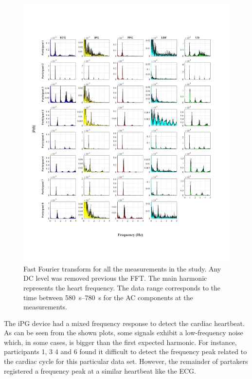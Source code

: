 \begin{figure}[!htpb]
	\includegraphics[width=1\textwidth,keepaspectratio,trim={0.75cm 0cm 2cm 2cm},clip]{figure1}    
	\caption[Fequency components of the signals acquired]{Fast Fourier transform for all the measurements in the study. Any DC level was removed previous the FFT. The main harmonic represents the heart frequency. The data range corresponds to the time between \SIrange{580}{780}{\second} for the AC components at the measurements.}
	\label{fig:fft signals}
\end{figure}

The iPG device had a mixed frequency response to detect the cardiac heartbeat. As can be seen from the shown plots, some signals exhibit a low-frequency noise which, in some cases, is bigger than the first expected harmonic. For instance, participants 1, 3 4 and 6 found it difficult to detect the frequency peak related to the cardiac cycle for this particular data set. However, the remainder of partakers registered a frequency peak at a similar heartbeat like the ECG. 

